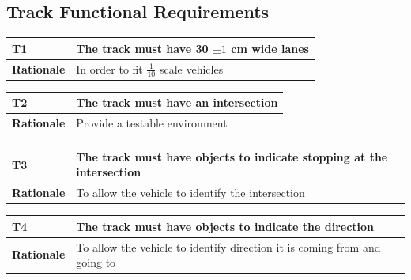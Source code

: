 \documentclass [11pt]{article}
\begin{document}



\subsection{Track Functional Requirements}

\begin{longtable}{| p{ } | p{ } | }\hline 
\rowcolor{tableCell}\textbf{T1} & The track must have 30 $\pm 1$ cm wide lanes \\ \hline
\textbf{Rationale} & In order to fit $\frac{1}{10}$ scale vehicles \\ \hline 

\end{longtable}

\begin{longtable}{| p{ } | p{ } | }\hline 
\rowcolor{tableCell}\textbf{T2} & The track must have an intersection \\ \hline
\textbf{Rationale} &  Provide a testable environment\\ \hline 

\end{longtable}

\begin{longtable}{| p{ } | p{ } | }\hline 
\rowcolor{tableCell}\textbf{T3} &  The track must have objects to indicate stopping at the intersection\\ \hline
\textbf{Rationale} & To allow the vehicle to identify the intersection \\ \hline 
\end{longtable}

\begin{longtable}{| p{ } | p{ } | }\hline 
\rowcolor{tableCell}\textbf{T4} & The track must have objects to indicate the direction \\ \hline
\textbf{Rationale} &  To allow the vehicle to identify direction it is coming from and going to\\ \hline 


\end{longtable}
\end{document}
